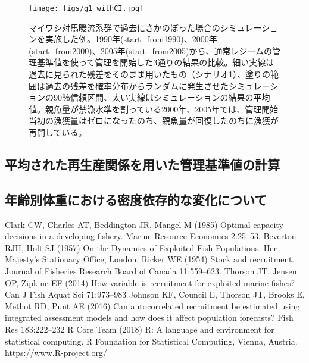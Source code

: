\documentclass[11pt]{jsarticle}
\begin{document}
 \begin{figure}[b]
   \texttt{[image: figs/g1\_withCI.jpg]}
   \caption{
     マイワシ対馬暖流系群で過去にさかのぼった場合のシミュレーションを実施した例。1990年(start\_from1990)、2000年(start\_from2000)、2005年(start\_from2005)から、通常レジームの管理基準値を使って管理を開始した3通りの結果の比較。細い実線は過去に見られた残差をそのまま用いたもの（シナリオ1）、塗りの範囲は過去の残差を確率分布からランダムに発生させたシミュレーションの90％信頼区間、太い実線はシミュレーションの結果の平均値。親魚量が禁漁水準を割っている2000年、2005年では、管理開始当初の漁獲量はゼロになったのち、親魚量が回復したのちに漁獲が再開している。
   }
   \label{fig_whatif}
 \end{figure}

 \subsection{平均された再生産関係を用いた管理基準値の計算}
 
 \subsection{年齢別体重における密度依存的な変化について}


\begin{thebibliography}{9}
   Clark CW, Charles AT, Beddington JR, Mangel M (1985) Optimal capacity decisions in a developing fishery. Marine Resource Economics 2:25--53.
 Beverton RJH, Holt SJ (1957) On the Dynamics of Exploited Fish Populations. Her Majesty’s Stationary Office, London.
 Ricker WE (1954) Stock and recruitment. Journal of Fisheries Research Board of Canada 11:559--623.
 Thorson JT, Jensen OP, Zipkinc EF (2014) How variable is recruitment for exploited marine fishes? Can J Fish Aquat Sci 71:973--983
 Johnson KF, Council E, Thorson JT, Brooks E, Methot RD, Punt AE (2016) Can autocorrelated recruitment be estimated using integrated assessment models and how does it affect population forecasts? Fish Res 183:222--232
 R Core Team (2018) R: A language and environment for statistical computing. R Foundation for Statistical Computing, Vienna, Austria. https://www.R-project.org/
  

\end{thebibliography}
\end{document}
